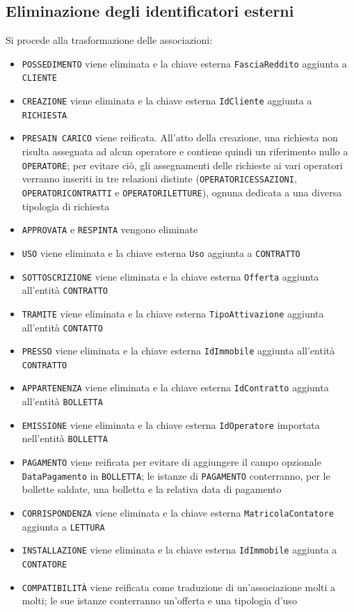 \documentclass[a4paper,12pt]{report}
\begin{document}
\subsection{Eliminazione degli identificatori esterni}
Si procede alla trasformazione delle associazioni:
\begin{itemize}
    \item \texttt{POSSEDIMENTO} viene eliminata e la chiave esterna \texttt{FasciaReddito} aggiunta a \texttt{CLIENTE}
    \item \texttt{CREAZIONE} viene eliminata e la chiave esterna \texttt{IdCliente} aggiunta a \texttt{RICHIESTA}
    \item \texttt{PRESA\textunderscore IN \textunderscore CARICO} viene reificata. All'atto della creazione, una richiesta non risulta assegnata ad alcun operatore e contiene quindi un riferimento nullo a \texttt{OPERATORE}; per evitare ciò, gli assegnamenti delle richieste ai vari operatori verranno inseriti in tre relazioni distinte (\texttt{OPERATORI\textunderscore CESSAZIONI}, \texttt{OPERATORI\textunderscore CONTRATTI} e \texttt{OPERATORI\textunderscore LETTURE}), ognuna dedicata a una diversa tipologia di richiesta
    \item \texttt{APPROVATA} e \texttt{RESPINTA} vengono eliminate
    \item \texttt{USO} viene eliminata e la chiave esterna \texttt{Uso} aggiunta a \texttt{CONTRATTO}
    \item \texttt{SOTTOSCRIZIONE} viene eliminata e la chiave esterna \texttt{Offerta} aggiunta all'entità \texttt{CONTRATTO}
    \item \texttt{TRAMITE} viene eliminata e la chiave esterna \texttt{TipoAttivazione} aggiunta all'entità \texttt{CONTATTO}
    \item \texttt{PRESSO} viene eliminata e la chiave esterna \texttt{IdImmobile} aggiunta all'entità \texttt{CONTRATTO}
    \item \texttt{APPARTENENZA} viene eliminata e la chiave esterna \texttt{IdContratto} aggiunta all'entità \texttt{BOLLETTA}
    \item \texttt{EMISSIONE} viene eliminata e la chiave esterna \texttt{IdOperatore} importata nell'entità \texttt{BOLLETTA}
    \item \texttt{PAGAMENTO} viene reificata per evitare di aggiungere il campo opzionale \texttt{DataPagamento} in \texttt{BOLLETTA}; le istanze di \texttt{PAGAMENTO} conterranno, per le bollette saldate, una bolletta e la relativa data di pagamento
    \item \texttt{CORRISPONDENZA} viene eliminata e la chiave esterna \texttt{MatricolaContatore} aggiunta a \texttt{LETTURA}
    \item \texttt{INSTALLAZIONE} viene eliminata e la chiave esterna \texttt{IdImmobile} aggiunta a \texttt{CONTATORE}
    \item \texttt{COMPATIBILITÀ} viene reificata come traduzione di un'associazione molti a molti; le sue istanze conterranno un'offerta e una tipologia d'uso
\end{itemize}
\end{document}
